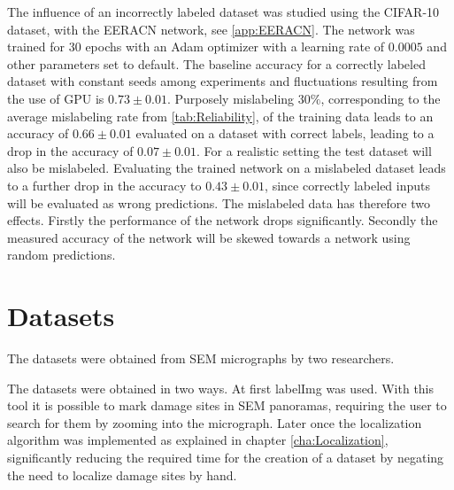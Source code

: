 The influence of an incorrectly labeled dataset was studied using the CIFAR-10 dataset, with the EERACN network, see \ref{app:EERACN}. The network was trained for $30$ epochs with an Adam optimizer \cite{Sharma2017} with a learning rate of $0.0005$ and other parameters set to default. The baseline accuracy for a correctly labeled dataset with constant seeds among experiments and fluctuations resulting from the use of GPU is $0.73\pm 0.01$. Purposely mislabeling $30 \%$, corresponding to the average mislabeling rate from \ref{tab:Reliability}, of the training data leads to an accuracy of $0.66\pm 0.01$ evaluated on a dataset with correct labels, leading to a drop in the accuracy of $0.07 \pm 0.01$. For a realistic setting the test dataset will also be mislabeled. Evaluating the trained network on a mislabeled dataset leads to a further drop in the accuracy to $0.43\pm 0.01$, since correctly labeled inputs will be evaluated as wrong predictions. The mislabeled data has therefore two effects. Firstly the performance of the network drops significantly. Secondly the measured accuracy of the network will be skewed towards a network using random predictions. 




\section{Datasets}
The datasets were obtained from SEM micrographs by two researchers. 



The datasets were obtained in two ways. At first labelImg \cite{labelImg} was used. With this tool it is possible to mark damage sites in SEM panoramas, requiring the user to search for them by zooming into the micrograph. Later once the localization algorithm was implemented as explained in chapter \ref{cha:Localization}, significantly reducing the required time for the creation of a dataset by negating the need to localize damage sites by hand. \\

